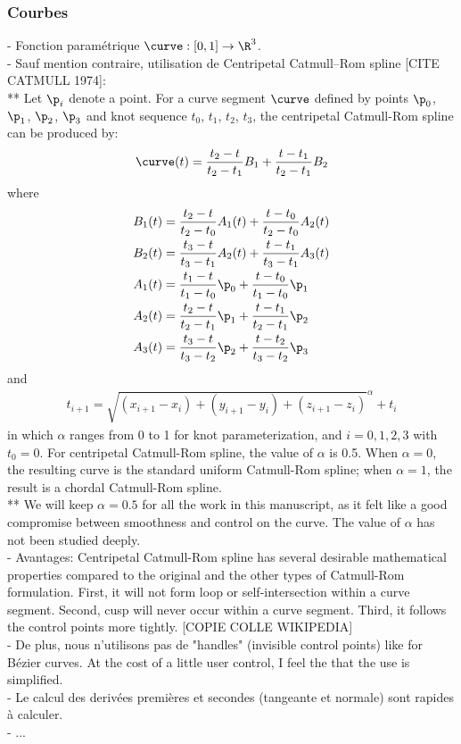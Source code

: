 \subsubsection{Courbes}
- Fonction paramétrique $\curve: [0, 1] \to \R^3$. \\
- Sauf mention contraire, utilisation de Centripetal Catmull–Rom spline [CITE CATMULL 1974]: \\
** Let $\p_i$ denote a point. For a curve segment $\curve$ defined by points $\p_0$, $\p_1$, $\p_2$, $\p_3$ and knot sequence $t_0$, $t_1$, $t_2$, $t_3$, the centripetal Catmull-Rom spline can be produced by:
\begin{align}
    \curve(t) = \frac{t_2 - t}{t_2 - t_1} B_1 + \frac{t - t_1}{t_2 - t_1} B_2
\end{align}
where
\begin{align}
    B_1(t) &= \frac {t_2 - t}{t_2 - t_0} A_1(t) + \frac{t - t_0}{t_2 - t_0} A_2(t) \\
    B_2(t) &= \frac{t_3 - t}{t_3 - t_1} A_2(t) + \frac{t - t_1}{t_3 - t_1} A_3(t) \\
    A_1(t) &= \frac{t_1 - t}{t_1 - t_0} \p_0 + \frac{t - t_0}{t_1 - t_0} \p_1 \\
    A_2(t) &= \frac{t_2 - t}{t_2 - t_1} \p_1 + \frac{t - t_1}{t_2 - t_1} \p_2 \\
    A_3(t) &= \frac{t_3 - t}{t_3 - t_2} \p_2 + \frac{t - t_2}{t_3 - t_2} \p_3
\end{align}
and
\begin{align}
    t_{i + 1} = \sqrt{ \left(x_{i+1} - x_i \right) + \left(y_{i+1} - y_i \right) +  \left(z_{i+1} - z_i \right)}^\alpha + t_i
\end{align}
in which $\alpha$ ranges from 0 to 1 for knot parameterization, and $i = 0, 1, 2, 3$ with $t_0 = 0$. For centripetal Catmull-Rom spline, the value of $\alpha$ is 
0.5. When $\alpha = 0$, the resulting curve is the standard uniform Catmull-Rom spline; when $\alpha = 1$, the result is a chordal Catmull-Rom spline. \\
** We will keep $\alpha = 0.5$ for all the work in this manuscript, as it felt like a good compromise between smoothness and control on the curve. The value of $\alpha$ has not been studied deeply. \\
- Avantages: Centripetal Catmull-Rom spline has several desirable mathematical properties compared to the original and the other types of Catmull-Rom formulation. First, it will not form loop or self-intersection within a curve segment. Second, cusp will never occur within a curve segment. Third, it follows the control points more tightly. [COPIE COLLE WIKIPEDIA] \\
- De plus, nous n'utilisons pas de "handles" (invisible control points) like for Bézier curves. At the cost of a little user control, I feel the that the use is simplified. \\
- Le calcul des derivées premières et secondes (tangeante et normale) sont rapides à calculer. \\
- ...


